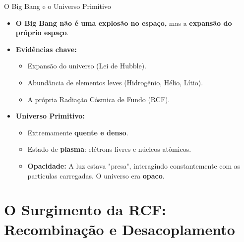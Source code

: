 \documentclass{beamer}
\begin{document}
\begin{frame}{O Big Bang e o Universo Primitivo}
    \begin{itemize}
        \item \textbf{O Big Bang não é uma explosão no espaço,} mas a \textbf{expansão do próprio espaço}.
        \item \textbf{Evidências chave:}
        \begin{itemize}
            \item Expansão do universo (Lei de Hubble).
            \item Abundância de elementos leves (Hidrogênio, Hélio, Lítio).
            \item A própria Radiação Cósmica de Fundo (RCF).
        \end{itemize}
        \item \textbf{Universo Primitivo:}
        \begin{itemize}
            \item Extremamente \textbf{quente e denso}.
            \item Estado de \textbf{plasma}: elétrons livres e núcleos atômicos.
            \item \textbf{Opacidade:} A luz estava "presa", interagindo constantemente com as partículas carregadas. O universo era \textbf{opaco}.
        \end{itemize}
    \end{itemize}
\end{frame}

\section{O Surgimento da RCF: Recombinação e Desacoplamento}
\end{document}
